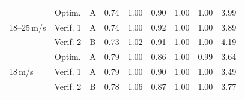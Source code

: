 \begin{table}[h]
\begin{tabular}{@{}l*{8}{c}@{}}
        \multirow{3}{*}{18--25\,m/s} & Optim. & A & 0.74 & 1.00 & 0.90 & 1.00 & 1.00 & 3.99 \\
         & Verif. 1 & A & 0.74 & 1.00 & 0.92 & 1.00 & 1.00 & 3.89 \\
         & Verif. 2 & B & 0.73 & 1.02 & 0.91 & 1.00 & 1.00 & 4.19 \\
        \midrule
        \multirow{3}{*}{18\,m/s} & Optim. & A & 0.79 & 1.00 & 0.86 & 1.00 & 0.99 & 3.64 \\
         & Verif. 1 & A & 0.79 & 1.00 & 0.90 & 1.00 & 1.00 & 3.49 \\
         & Verif. 2 & B & 0.78 & 1.06 & 0.87 & 1.00 & 1.00 & 3.77 \\
        \bottomrule
    \end{tabular}
\end{table}
